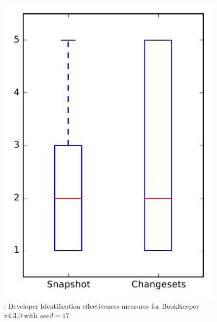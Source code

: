 
\begin{figure}
\centering
\includegraphics[height=0.4\textheight]{figures/dit_seed/rq1_bookkeeper_17}
\caption{\rtwo: Developer Identification effectiveness measures for BookKeeper v4.3.0 with $seed=17$}
\label{fig:dit_seed:rq1:bookkeeper}
\end{figure}
